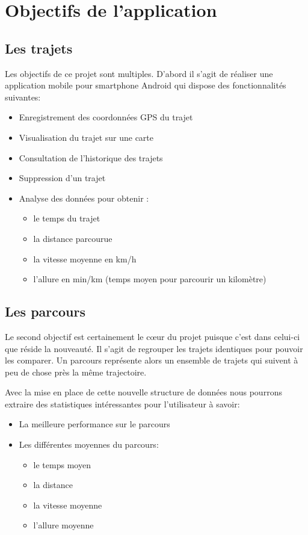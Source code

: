 \chapter{Objectifs de l'application}
\section{Les trajets}
Les objectifs de ce projet sont multiples. D'abord il s'agit de réaliser une application mobile pour smartphone Android qui dispose des fonctionnalités suivantes:\bigskip

\begin{itemize}
  \item Enregistrement des coordonnées GPS du trajet
  \item Visualisation du trajet sur une carte 
  \item Consultation de l'historique des trajets 
  \item Suppression d'un trajet 
  \item Analyse des données pour obtenir :
  \begin{itemize}
    \item le temps du trajet
    \item la distance parcourue
    \item la vitesse moyenne en km/h
    \item l'allure en min/km (temps moyen pour parcourir un kilomètre)
  \end{itemize}
\end{itemize}\bigskip

\section{Les parcours}
Le second objectif est certainement le cœur du projet puisque c'est dans celui-ci que réside la nouveauté. Il s'agit de regrouper les trajets identiques pour pouvoir les comparer. Un parcours représente alors un ensemble de trajets qui suivent à peu de chose près la même trajectoire.\bigskip

Avec la mise en place de cette nouvelle structure de données nous pourrons extraire des statistiques intéressantes pour l'utilisateur à savoir:\bigskip

\begin{itemize}
  \item La meilleure performance sur le parcours
  \item Les différentes moyennes du parcours:
  \begin{itemize}
    \item le temps moyen
    \item la distance
    \item la vitesse moyenne
    \item l'allure moyenne
  \end{itemize}   
\end{itemize}\bigskip

